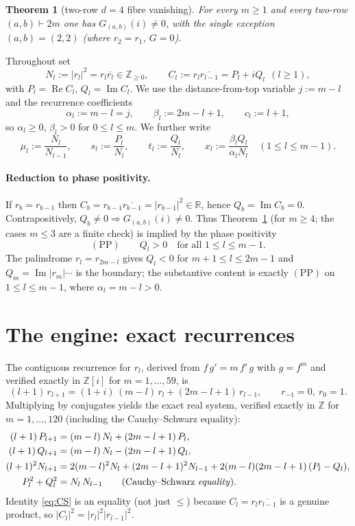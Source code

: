 \documentclass[11pt]{article}
\newtheorem{theorem}{Theorem}
\theoremstyle{definition}
\newcommand{\Z}{\mathbb{Z}}
\newcommand{\R}{\mathbb{R}}
\newcommand{\Zi}{\Z[i]}
\renewcommand{\Re}{\operatorname{Re}}
\renewcommand{\Im}{\operatorname{Im}}
\begin{document}
\begin{theorem}[two-row $d=4$ fibre vanishing]\label{thm:main}
For every $m\ge1$ and every two-row $(a,b)\vdash2m$ one has
$G_{(a,b)}(i)\neq0$, with the single exception $(a,b)=(2,2)$ (where
$r_2=r_1$, $G=0$).
\end{theorem}

Throughout set
\[
  N_l:=|r_l|^2=r_l\overline{r_l}\in\Z_{\ge0},\qquad
  C_l:=r_l\overline{r_{l-1}}=P_l+iQ_l\ \ (l\ge1),
\]
with $P_l=\Re C_l$, $Q_l=\Im C_l$.  We use the distance-from-top variable
$j:=m-l$ and the recurrence coefficients
\[
  \alpha_l:=m-l=j,\qquad \beta_l:=2m-l+1,\qquad c_l:=l+1 ,
\]
so $\alpha_l\ge0$, $\beta_l>0$ for $0\le l\le m$.  We further write
\[
  \mu_l:=\frac{N_l}{N_{l-1}},\qquad s_l:=\frac{P_l}{N_l},\qquad
  t_l:=\frac{Q_l}{N_l},\qquad
  x_l:=\frac{\beta_lQ_l}{\alpha_lN_l}\quad(1\le l\le m-1) .
\]

\paragraph{Reduction to phase positivity.}  If $r_b=r_{b-1}$ then
$C_b=r_{b-1}\overline{r_{b-1}}=|r_{b-1}|^2\in\R$, hence $Q_b=\Im C_b=0$.
Contrapositively, $Q_b\neq0\Rightarrow G_{(a,b)}(i)\neq0$.  Thus
Theorem~\ref{thm:main} (for $m\ge4$; the cases $m\le3$ are a finite check)
is implied by the phase positivity
\[
  (\mathrm{PP})\qquad Q_l>0\quad\text{for all }1\le l\le m-1 .
\]
The palindrome $r_l=r_{2m-l}$ gives $Q_l<0$ for $m+1\le l\le 2m-1$ and
$Q_m=\Im|r_{m}|\cdots$ is the boundary; the substantive content is exactly
$(\mathrm{PP})$ on $1\le l\le m-1$, where $\alpha_l=m-l>0$.

\section{The engine: exact recurrences}\label{sec:engine}

The contiguous recurrence for $r_l$, derived from $f\,g'=m\,f'\,g$ with
$g=f^m$ and verified exactly in $\Zi$ for $m=1,\dots,59$, is
\begin{equation}\label{eq:rrec}
  (l+1)\,r_{l+1}=(1+i)\,(m-l)\,r_l+(2m-l+1)\,r_{l-1},
  \qquad r_{-1}=0,\ r_0=1 .
\end{equation}
Multiplying by conjugates yields the exact real system, verified exactly
in $\Z$ for $m=1,\dots,120$ (including the Cauchy--Schwarz equality):
\begin{align}
  (l+1)\,P_{l+1}&=(m-l)\,N_l+(2m-l+1)\,P_l, \label{eq:Prec}\\
  (l+1)\,Q_{l+1}&=(m-l)\,N_l-(2m-l+1)\,Q_l, \label{eq:Qrec}\\
  (l+1)^2 N_{l+1}&=2(m-l)^2N_l+(2m-l+1)^2N_{l-1}
        +2(m-l)(2m-l+1)\,(P_l-Q_l), \label{eq:Nrec}\\
  P_l^2+Q_l^2&=N_l\,N_{l-1}\qquad(\text{Cauchy--Schwarz \emph{equality}}).
        \label{eq:CS}
\end{align}
Identity \eqref{eq:CS} is an equality (not just $\le$) because
$C_l=r_l\overline{r_{l-1}}$ is a genuine product, so
$|C_l|^2=|r_l|^2|r_{l-1}|^2$.
\end{document}
